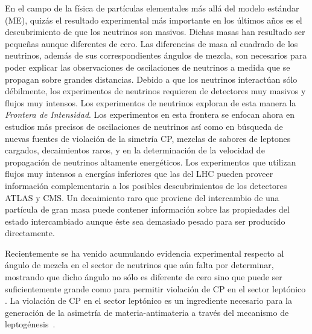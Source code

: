 En el campo de la física de partículas elementales más allá del
modelo estándar (ME), quizás el resultado experimental más importante
en los últimos años es el descubrimiento de que los neutrinos
son masivos. Dichas masas han resultado ser pequeñas aunque diferentes de
cero. Las diferencias de masa al cuadrado de los neutrinos, además de sus
correspondientes ángulos de mezcla, son necesarios para poder explicar
las observaciones de oscilaciones de neutrinos a medida que se
propagan sobre grandes distancias. Debido a que los neutrinos
interactúan sólo débilmente, los experimentos de neutrinos requieren
de detectores muy masivos y flujos muy
intensos. Los experimentos de neutrinos exploran de esta manera la
\emph{Frontera de Intensidad}. Los experimentos en esta frontera se
enfocan ahora en estudios más precisos de oscilaciones de neutrinos
así como en búsqueda de nuevas fuentes de violación de la simetría CP, mezclas de
sabores de leptones cargados, decaimientos raros, y en la
determinación de la velocidad de propagación de neutrinos altamente
energéticos. Los experimentos que utilizan flujos muy intensos a energías
inferiores que las del LHC pueden proveer información complementaria a los
posibles descubrimientos de los detectores ATLAS y CMS. Un decaimiento
raro que proviene del intercambio de una partícula de gran masa puede
contener información sobre las propiedades del estado intercambiado
aunque éste sea demasiado pesado para ser producido directamente.

Recientemente se ha venido acumulando evidencia experimental respecto
al ángulo de mezcla en el sector de neutrinos que aún falta por
determinar, mostrando que dicho ángulo no sólo es diferente de cero
sino que puede ser suficientemente grande como para permitir violación
de CP en el sector leptónico \cite{valle}. La violación de CP en el
sector leptónico es un ingrediente necesario para la generación de la asimetría
de materia-antimateria a través del mecanismo de
leptogénesis~\cite{Davidson:2008bu}.


